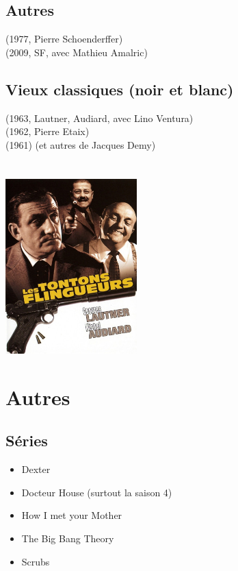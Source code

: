 \subsection{Autres}
(1977, Pierre Schoenderffer) \\
(2009, SF, avec Mathieu Amalric) \\

\subsection{Vieux classiques (noir et blanc)}
(1963, Lautner, Audiard, avec Lino Ventura) \\
 (1962, Pierre Etaix) \beau  \\
(1961) (et autres de Jacques Demy) \beau  \\ \\ \\
\includegraphics[width=0.38\textwidth]{affiches/tontons.jpg}





\newpage
\section{Autres}
\subsection{Séries}
\begin{itemize}
\item Dexter
\item Docteur House (surtout la saison 4)
\item How I met your Mother
\item The Big Bang Theory
\item Scrubs
\end{itemize}

